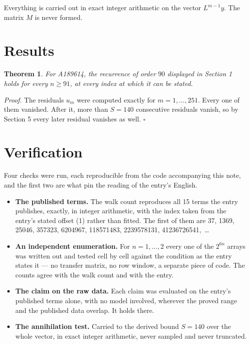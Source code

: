 \documentclass[11pt]{article}
\newtheorem{theorem}{Theorem}
\theoremstyle{definition}
\begin{document}
Everything is carried out in exact integer arithmetic on the vector $L^{m-1}y$. The matrix $M$ is never formed.

\section{Results}

\begin{theorem} For A189614, the recurrence of order $90$ displayed in Section 1 holds for every $n \ge 91$, at every index at which it can be stated.\end{theorem}

{\itshape Proof.} The residuals $u_m$ were computed exactly for $m = 1,\dots,251$. Every one of them vanished. After it, more than $S = 140$ consecutive residuals vanish, so by Section 5 every later residual vanishes as well. $\square$

\section{Verification}

Four checks were run, each reproducible from the code accompanying this note, and the first two are what pin the reading of the entry's English.

\begin{itemize}

\item {\bfseries The published terms.} The walk count reproduces all 15 terms the entry publishes, exactly, in integer arithmetic, with the index taken from the entry's stated offset (1) rather than fitted. The first of them are 37, 1369, 25046, 357323, 6204967, 118571483, 2239578131, 41236726541,~\dots

\item {\bfseries An independent enumeration.} For $n = 1,\dots,2$ every one of the $2^{6n}$ arrays was written out and tested cell by cell against the condition as the entry states it --- no transfer matrix, no row window, a separate piece of code. The counts agree with the walk count and with the entry.

\item {\bfseries The claim on the raw data.} Each claim was evaluated on the entry's published terms alone, with no model involved, wherever the proved range and the published data overlap. It holds there.

\item {\bfseries The annihilation test.} Carried to the derived bound $S = 140$ over the whole vector, in exact integer arithmetic, never sampled and never truncated.

\end{itemize}
\end{document}
